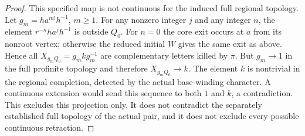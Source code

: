 \begin{proof}
This specified map is not continuous for the induced full regional
topology. Let $g_m=ha^{m!}h^{-1}$, $m\geq1$. For any nonzero
integer $j$ and any integer $n$, the element
$r^{-n}ha^jh^{-1}$ is outside $Q_0$. For $n=0$ the core exit
occurs at $a$ from its nonroot vertex; otherwise the reduced initial
$W$ gives the same exit as above. Hence all
$X_{g_mQ_0}=g_mkg_m^{-1}$ are complementary letters killed by
$\pi$. But $g_m\to1$ in the full profinite topology and therefore
$X_{g_mQ_0}\to k$. The element $k$ is nontrivial in the regional
completion, detected by the actual base-winding character. A
continuous extension would send this sequence to both $1$ and
$k$, a contradiction. This excludes this projection only. It does
not contradict the separately established full topology of the
actual pair, and it does not exclude every possible continuous
retraction.


\end{proof}
